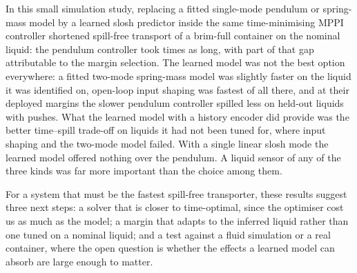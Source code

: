 In this small simulation study, replacing a fitted single-mode pendulum or spring-mass model by a learned slosh predictor inside the same time-minimising MPPI controller shortened spill-free transport of a brim-full container on the nominal liquid: the pendulum controller took  times as long, with part of that gap attributable to the margin selection. The learned model was not the best option everywhere: a fitted two-mode spring-mass model was slightly faster on the liquid it was identified on, open-loop input shaping was fastest of all there, and at their deployed margins the slower pendulum controller spilled less on held-out liquids with pushes. What the learned model with a history encoder did provide was the better time--spill trade-off on liquids it had not been tuned for, where input shaping and the two-mode model failed. With a single linear slosh mode the learned model offered nothing over the pendulum. A liquid sensor of any of the three kinds was far more important than the choice among them.

For a system that must be the fastest spill-free transporter, these results suggest three next steps: a solver that is closer to time-optimal, since the optimiser cost us as much as the model; a margin that adapts to the inferred liquid rather than one tuned on a nominal liquid; and a test against a fluid simulation or a real container, where the open question is whether the effects a learned model can absorb are large enough to matter.
